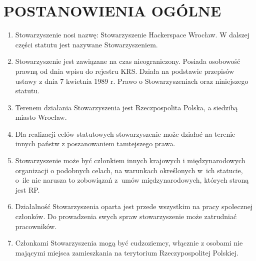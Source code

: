 \documentclass{article}
\begin{document}
\section{POSTANOWIENIA OGÓLNE}
  \begin{enumerate}
    \item Stowarzyszenie nosi nazwę: Stowarzyszenie Hackerspace Wrocław. W dalszej części statutu jest nazywane Stowarzyszeniem.
    \item Stowarzyszenie jest zawiązane na czas nieograniczony. Posiada osobowość prawną od dnia wpisu do rejestru KRS. Działa na podstawie przepisów ustawy z dnia 7 kwietnia 1989 r. Prawo o Stowarzyszeniach oraz niniejszego statutu.
    \item Terenem działania Stowarzyszenia jest Rzeczpospolita Polska, a siedzibą miasto Wrocław.
    \item Dla realizacji celów statutowych stowarzyszenie może działać na terenie innych państw z poszanowaniem tamtejszego prawa.
    \item Stowarzyszenie może być członkiem innych krajowych i międzynarodowych organizacji o podobnych celach, na warunkach określonych w~ich statucie, o~ile nie narusza to zobowiązań z~umów międzynarodowych, których stroną jest RP.
    \item Działalność Stowarzyszenia oparta jest przede wszystkim na pracy społecznej członków. Do prowadzenia swych spraw stowarzyszenie może zatrudniać pracowników.
    \item Członkami Stowarzyszenia mogą być cudzoziemcy, włącznie z osobami nie mającymi miejsca zamieszkania na terytorium Rzeczypospolitej Polskiej.
  \end{enumerate}
\end{document}
